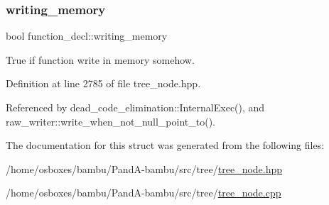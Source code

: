 \subsubsection{\texorpdfstring{writing\+\_\+memory}{writing\_memory}}
{\footnotesize\ttfamily bool function\+\_\+decl\+::writing\+\_\+memory}



True if function write in memory somehow. 



Definition at line 2785 of file tree\+\_\+node.\+hpp.



Referenced by dead\+\_\+code\+\_\+elimination\+::\+Internal\+Exec(), and raw\+\_\+writer\+::write\+\_\+when\+\_\+not\+\_\+null\+\_\+point\+\_\+to().



The documentation for this struct was generated from the following files\+:\begin{DoxyCompactItemize}
\item 
/home/osboxes/bambu/\+Pand\+A-\/bambu/src/tree/\hyperlink{tree__node_8hpp}{tree\+\_\+node.\+hpp}\item 
/home/osboxes/bambu/\+Pand\+A-\/bambu/src/tree/\hyperlink{tree__node_8cpp}{tree\+\_\+node.\+cpp}\end{DoxyCompactItemize}
